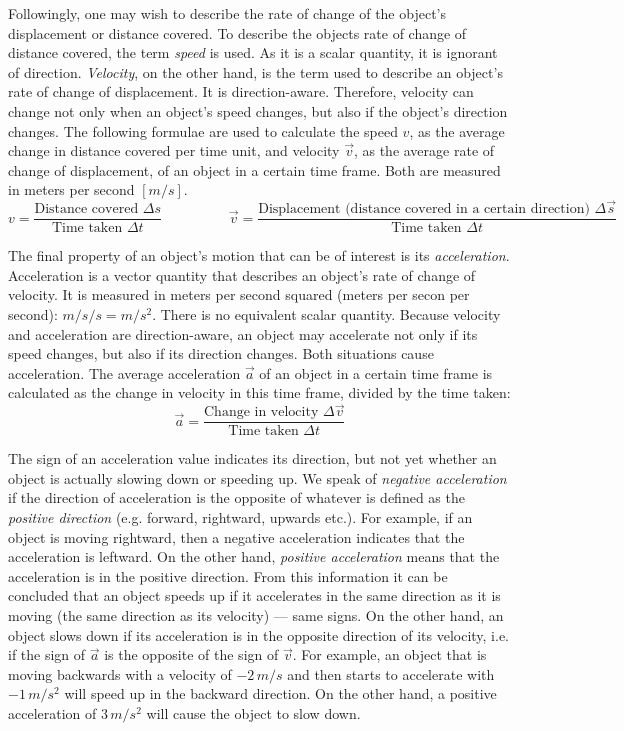 Followingly, one may wish to describe the rate of change of the object's displacement or distance covered. To describe the objects rate of change of distance covered, the term \emph{speed} is used. As it is a scalar quantity, it is ignorant of direction. \emph{Velocity}, on the other hand, is the term used to describe an object's rate of change of displacement. It is direction-aware. Therefore, velocity can change not only when an object's speed changes, but also if the object's direction changes. The following formulae are used to calculate the speed $v$, as the average change in distance covered per time unit, and velocity $\vec{v}$, as the average rate of change of displacement, of an object in a certain time frame. Both are measured in meters per second $[m/s]$. $$v = \frac{\text{Distance covered } \Delta s}{\text{Time taken } \Delta t} \hspace{2cm} \vec{v} = \frac{\text{Displacement (distance covered in a certain direction) } \Delta \vec{s}}{\text{Time taken } \Delta t}$$

The final property of an object's motion that can be of interest is its \emph{acceleration}. Acceleration is a vector quantity that describes an object's rate of change of velocity. It is measured in meters per second squared (meters per secon per second): $m/s/s = m/s^2$. There is no equivalent scalar quantity. Because velocity and acceleration are direction-aware, an object may accelerate not only if its speed changes, but also if its direction changes. Both situations cause acceleration. The average acceleration $\vec{a}$ of an object in a certain time frame is calculated as the change in velocity in this time frame, divided by the time taken: $$\vec{a} = \frac{\text{Change in velocity } \Delta \vec{v}}{\text{Time taken } \Delta t}$$ 

The sign of an acceleration value indicates its direction, but not yet whether an object is actually slowing down or speeding up. We speak of \emph{negative acceleration} if the direction of acceleration is the opposite of whatever is defined as the \emph{positive direction} (e.g. forward, rightward, upwards etc.). For example, if an object is moving rightward, then a negative acceleration indicates that the acceleration is leftward. On the other hand, \emph{positive acceleration} means that the acceleration is in the positive direction. From this information it can be concluded that an object speeds up if it accelerates in the same direction as it is moving (the same direction as its velocity) --- same signs. On the other hand, an object slows down if its acceleration is in the opposite direction of its velocity, i.e. if the sign of $\vec{a}$ is the opposite of the sign of $\vec{v}$. For example, an object that is moving backwards with a velocity of $-2 \, m/s$ and then starts to accelerate with $-1 \, m/s^2$ will speed up in the backward direction. On the other hand, a positive acceleration of $3 \, m/s^2$ will cause the object to slow down. 

